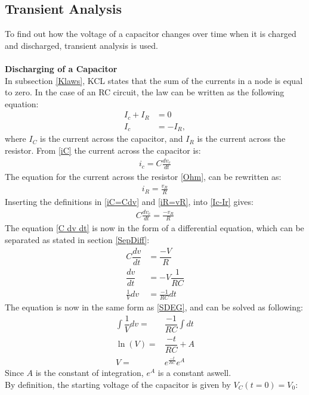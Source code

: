 \subsection{Transient Analysis}
\label{sec371}
To find out how the voltage of a capacitor changes over time when it is charged and discharged, transient analysis is used.
\\
\\
\textbf{Discharging of a Capacitor}\\
In subsection \ref{Klaws}, KCL states that the sum of the currents in a node is equal to zero. In the case of an RC circuit, the law can be written as the following equation:
\begin{align}
I_{c}+I_{R}&=0 \nonumber \\
I_{c}&= -I_{R}, \label{Ic-Ir}
\end{align}
where $I_C$ is the current across the capacitor, and $I_R$ is the current across the resistor. From \eqref{iC} the current across the capacitor is:
\begin{align}
	i_c = C\frac{dv_c}{dt}\label{iC=Cdv}
\end{align}
The equation for the current across the resistor \eqref{Ohm}, can be rewritten as:
\begin{align}
	i_R = \frac{v_R}{R}\label{iR=vR}
\end{align}
Inserting the definitions in \eqref{iC=Cdv} and \eqref{iR=vR}, into \eqref{Ic-Ir} gives:
\begin{align}
	C\frac{dv_c}{dt} = \frac{-v_R}{R}\label{C dv dt}
\end{align}
The equation \eqref{C dv dt} is now in the form of a differential equation, which can be separated as stated in section \ref{SepDiff}:
\begin{align*}
C \dfrac{dv}{dt}&=\dfrac{-V}{R} \\
\dfrac{dv}{dt} &= -V\dfrac{1}{RC} \\
\frac{1}{V}dv &= \frac{-1}{RC}dt
\end{align*}
The equation is now in the same form as \eqref{SDEG}, and can be solved as following:
\begin{align}
\int \dfrac{1}{V}dv =& \dfrac{-1}{RC} \int dt\nonumber \\
\ln(V) =& \dfrac{-t}{RC} + A \nonumber\\
V =& e^{\frac{-t}{RC}}e^{A}\label{V_eA}
\end{align}
Since $A$ is the constant of integration, $e^A$ is a constant aswell.
\\
By definition, the starting voltage of the capacitor is given by $V_C(t=0)=V_0$:
